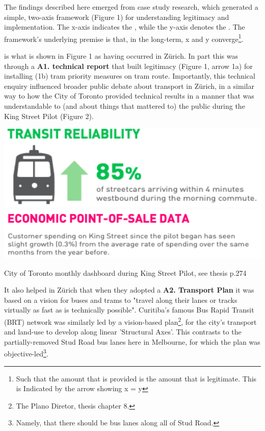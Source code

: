 \documentclass[nobib]{tufte-handout}
\begin{document}
The findings described here emerged from case study research, which generated a simple, two-axis framework (Figure 1) for understanding legitimacy and implementation. The x-axis indicates the , while the y-axis denotes the .  The framework's underlying premise is that, in the long-term,  x and y converge\footnote{Such that the amount that is provided is the amount that is legitimate. This is Indicated by the arrow showing x = y}. 

 is what is shown in Figure 1 as having occurred in Zürich. In part this was through a \textbf{A1. technical report} that built legitimacy (Figure 1, arrow 1a) for installing (1b) tram priority measures on tram route. Importantly, this technical enquiry influenced broader public debate about transport in Zürich, in a similar way to how the City of Toronto provided technical results in a manner that was understandable to (and about things that mattered to) the public during the King Street Pilot (Figure 2). 
\begin{marginfigure}%
  \includegraphics[width=\linewidth]{Toronto_dashboard_1}
   \includegraphics[width=\linewidth]{Toronto_dashboard_4}
  \caption{City of Toronto monthly dashboard during King Street Pilot, see thesis p.274}
  \label{fig:Toronto_dashboard}
\end{marginfigure}
It also helped in Zürich that when they adopted a \textbf{A2. Transport Plan} it was based on a vision for buses and trams to "travel along their lanes or tracks virtually as fast as is technically possible"\citep{Nash:2001ab}. Curitiba's famous Bus Rapid Transit (BRT) network was similarly led by a vision-based plan\footnote{The Plano Diretor, thesis chapter 8.}, for the city's transport and land-use to develop along linear 'Structural Axes'. This contrasts to the partially-removed Stud Road bus lanes here in Melbourne, for which the plan was objective-led\footnote{Namely, that there should be bus lanes along all of Stud Road.}.
\end{document}
